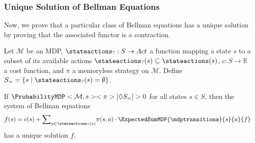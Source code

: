 \documentclass{theoretics}
\newcommand{\Reals}{\mathbb{R}}
\newcommand{\MDP}{\mathcal{M}}
\newcommand{\States}{S}
\newcommand{\Actions}{Act}
\newcommand{\strategy}{\pi}
\newcommand{\reach}{\Diamond}
\begin{document}
\subsubsection*{Unique Solution of Bellman Equations}
Now, we prove that a particular class of Bellman equations has a unique solution by proving that the associated functor is a contraction.
\begin{lemma} \label{stm:bellman_unique_solution}
	Let $\MDP$ be an MDP, $\stateactions_? : \States \to \Actions$ a function mapping a state $s$ to a subset of its available actions $\stateactions_?(s) \subseteq \stateactions(s)$, $c : \States \to \Reals$ a cost function, and $\strategy$ a memoryless strategy on $\MDP$.
	Define $\States_= = \{s \mid \stateactions_?(s) = \emptyset\}$.

	If $\ProbabilityMDP<\MDP, s><\strategy>[\reach \States_=] > 0$ for all states $s \in \States$, then the system of Bellman equations
	\begin{equation*}
		f(s) = c(s) + {\sum}_{a \in \stateactions_?(s)} \strategy(s, a) \cdot \ExpectedSumMDP{\mdptransitions}{s}{a}{f}
	\end{equation*}
	has a unique solution $f$.
\end{lemma}
\end{document}
